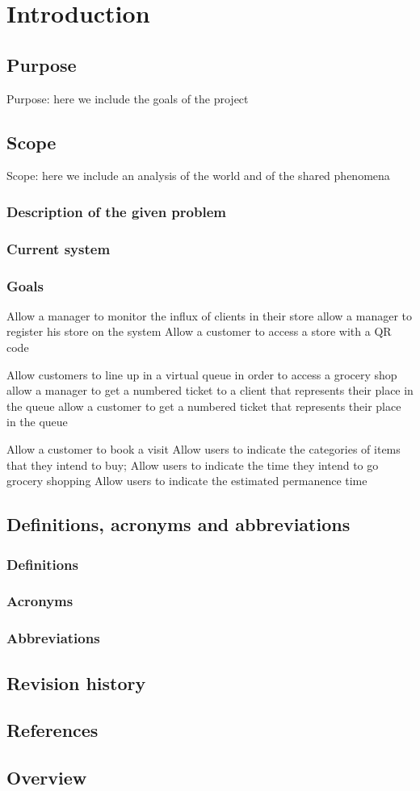 \section{Introduction}
\label{sect:introduction}
\subsection{Purpose}
Purpose: here we include the goals of the project
\subsection{Scope}
Scope: here we include an analysis of the world and of the shared phenomena
\subsubsection{Description of the given problem}
\subsubsection{Current system}
\subsubsection{Goals}
Allow a manager to monitor the influx of clients in their store 
allow a manager to register his store on the system
Allow a customer to access a store with a QR code

Allow customers to line up in a virtual queue in order to access a grocery shop
allow a manager to get a numbered ticket to a client that represents their place in the queue
allow a customer to get a numbered ticket that represents their place in the queue

Allow a customer to book a visit
Allow users to indicate the categories of items that they intend to buy;
Allow users to indicate the time they intend to go grocery shopping
Allow users to indicate the estimated permanence time 
\subsection{Definitions, acronyms and abbreviations}
\subsubsection{Definitions}
\subsubsection{Acronyms}
\subsubsection{Abbreviations}
\subsection{Revision history}
\subsection{References}
\subsection{Overview}